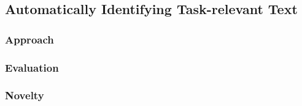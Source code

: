 

\subsection{Automatically Identifying Task-relevant Text}


\subsubsection{Approach}



\subsubsection{Evaluation}



\subsubsection{Novelty}